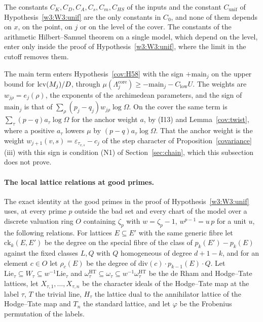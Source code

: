 The constants $C_K,C_D,C_A,C_s,C_m,C_{HS}$ of the inputs and the constant $C_{\mathrm{unif}}$ of Hypothesis~\ref{w3:W3:unif} are the only constants in $C_0$, and none of them depends on $x$, on the point, on $j$ or on the level of the cover. The constants of the arithmetic Hilbert--Samuel theorem on a single model, which depend on the level, enter only inside the proof of Hypothesis~\ref{w3:W3:unif}, where the limit in the cutoff removes them.

\begin{remark}\label{cov:sign}
The main term enters Hypothesis~\ref{cov:H58} with the sign $+\mathrm{main}_j$ on the upper bound for $\operatorname{lcv}(M_j)/D$, through $\mu(\Lambda^{\mathrm{core}}_j)\ge-\mathrm{main}_j-C_{\mathrm{low}}U$. The weights are $w_{j\rho}=e_j(\rho)$, the exponents of the archimedean parameters, and the sign of $\mathrm{main}_j$ is that of $\sum_\rho(p_j-q_j)w_{j\rho}\log\Omega$. On the cover the same term is $\sum_\tau(p-q)a_\tau\log\Omega$ for the anchor weight $a$, by (I13) and Lemma~\ref{cov:twist}, where a positive $a_\tau$ lowers $\mu$ by $(p-q)a_\tau\log\Omega$. That the anchor weight is the weight $w_{j+1}(v,s)=\varepsilon_{\tau_{v,s}}-c_j$ of the step character of Proposition~\ref{covariance}(iii) with this sign is condition (N1) of Section~\ref{sec:chain}, which this subsection does not prove.
\end{remark}

\paragraph{The local lattice relations at good primes.}
The exact identity at the good primes in the proof of Hypothesis~\ref{w3:W3:unif} uses, at every prime $p$ outside the bad set and every chart of the model over a discrete valuation ring $O$ containing $\zeta_p$ with $w=\zeta_p-1$, $w^{p-1}=u\,p$ for a unit $u$, the following relations. For lattices $E\subseteq E'$ with the same generic fibre let $\mathrm{ck}_k(E,E')$ be the degree on the special fibre of the class of $p_k(E')-p_k(E)$ against the fixed classes $L,Q$ with $Q$ homogeneous of degree $d+1-k$, and for an element $c\in O$ let $\rho_c(E)$ be the degree of $\mathrm{div}(c)\cdot p_{k-1}(E)\cdot Q$. Let $\mathrm{Lie}_\tau\subseteq W_\tau\subseteq w^{-1}\mathrm{Lie}_\tau$ and $\omega^{\mathrm{HT}}_\tau\subseteq\omega_\tau\subseteq w^{-1}\omega^{\mathrm{HT}}_\tau$ be the de Rham and Hodge--Tate lattices, let $X_{\tau,1},\dots,X_{\tau,n}$ be the character ideals of the Hodge--Tate map at the label $\tau$, $T$ the trivial line, $H_\tau$ the lattice dual to the annihilator lattice of the Hodge--Tate map and $T_n$ the standard lattice, and let $\varphi$ be the Frobenius permutation of the labels.


